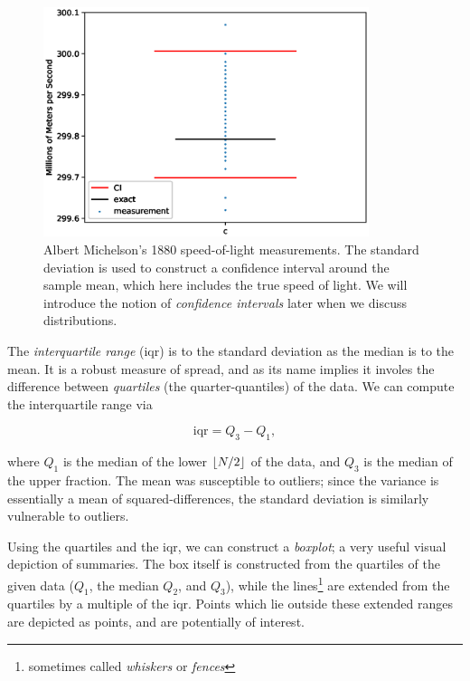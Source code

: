 \documentclass[../primer.tex]{subfiles}
\begin{document}
\begin{figure}[!ht]
  \centering
  \includegraphics[width=0.85\textwidth]{./images/michelson_ci}

  \caption{Albert Michelson's 1880 speed-of-light measurements. The standard
    deviation is used to construct a confidence interval around the sample mean,
    which here includes the true speed of light. We will introduce the notion of
    \emph{confidence intervals} later when we discuss distributions.}
  \label{fig:michelson-ci}
\end{figure}

The \emph{interquartile range} (iqr) is to the standard deviation
as the median is to the mean. It is a robust measure of spread, and as its name
implies it involes the difference between \emph{quartiles} (the
quarter-quantiles) of the data. We can compute the interquartile range via

\begin{equation} \label{eq:iqr-sample}
  \text{iqr} = Q_3 - Q_1,
\end{equation}

\noindent where $Q_1$ is the median of the lower $\lfloor N/2\rfloor$ of the data, and
$Q_3$ is the median of the upper fraction.\cite{tukey1977eda} The mean was
susceptible to outliers; since the variance is essentially a mean of
squared-differences, the standard deviation is similarly vulnerable to outliers.

Using the quartiles and the iqr, we can construct a \emph{boxplot}; a very
useful visual depiction of summaries. The box itself is constructed from the
quartiles of the given data ($Q_1$, the median $Q_2$, and $Q_3$), while the
lines\footnote{sometimes called \emph{whiskers} or \emph{fences}} are extended
from the quartiles by a multiple of the iqr. Points which lie outside these
extended ranges are depicted as points, and are potentially of interest.
\end{document}
